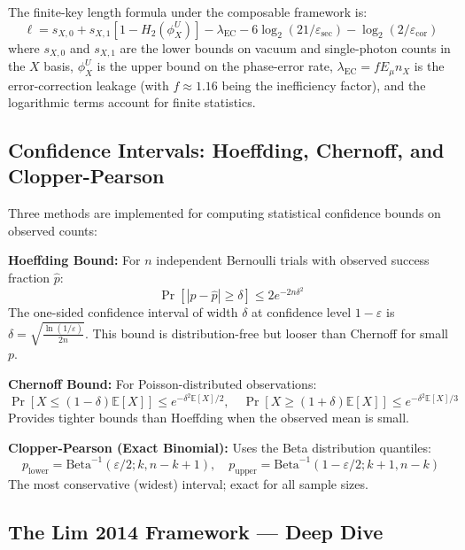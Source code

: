 \documentclass[11pt,a4paper,oneside]{report}
\begin{document}
The finite-key length formula under the composable framework is:
\begin{equation}
\ell = s_{X,0} + s_{X,1}[1 - H_2(\phi_X^U)] - \lambda_{\text{EC}} - 6\log_2(21/\varepsilon_{\text{sec}}) - \log_2(2/\varepsilon_{\text{cor}})
\label{eq:finite_key}
\end{equation}
where $s_{X,0}$ and $s_{X,1}$ are the lower bounds on vacuum and single-photon counts in the $X$ basis, $\phi_X^U$ is the upper bound on the phase-error rate, $\lambda_{\text{EC}} = f E_\mu n_X$ is the error-correction leakage (with $f \approx 1.16$ being the inefficiency factor), and the logarithmic terms account for finite statistics.

\subsection{Confidence Intervals: Hoeffding, Chernoff, and Clopper-Pearson}

Three methods are implemented for computing statistical confidence bounds on observed counts:

\textbf{Hoeffding Bound:} For $n$ independent Bernoulli trials with observed success fraction $\hat{p}$:
\begin{equation}
\Pr[|p - \hat{p}| \geq \delta] \leq 2e^{-2n\delta^2}
\end{equation}
The one-sided confidence interval of width $\delta$ at confidence level $1-\varepsilon$ is $\delta = \sqrt{\frac{\ln(1/\varepsilon)}{2n}}$. This bound is distribution-free but looser than Chernoff for small $p$.

\textbf{Chernoff Bound:} For Poisson-distributed observations:
\begin{equation}
\Pr[X \leq (1-\delta)\mathbb{E}[X]] \leq e^{-\delta^2\mathbb{E}[X]/2}, \quad \Pr[X \geq (1+\delta)\mathbb{E}[X]] \leq e^{-\delta^2\mathbb{E}[X]/3}
\end{equation}
Provides tighter bounds than Hoeffding when the observed mean is small.

\textbf{Clopper-Pearson (Exact Binomial):} Uses the Beta distribution quantiles:
\begin{equation}
p_{\text{lower}} = \text{Beta}^{-1}(\varepsilon/2; k, n-k+1), \quad p_{\text{upper}} = \text{Beta}^{-1}(1-\varepsilon/2; k+1, n-k)
\end{equation}
The most conservative (widest) interval; exact for all sample sizes.

\subsection{The Lim 2014 Framework — Deep Dive}
\end{document}

